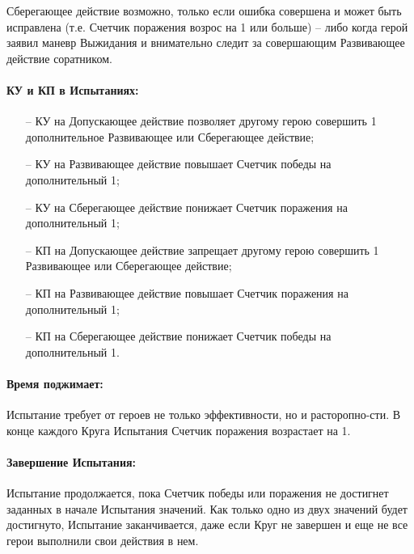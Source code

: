 \begin{itemize}
\begin{tcolorbox}
Сберегающее действие возможно, только если ошибка совершена и может быть исправлена (т.е. Счетчик поражения возрос на 1 или больше) – либо когда герой заявил маневр Выжидания и внимательно следит за совершающим Развивающее действие соратником.
\end{tcolorbox}
\end{itemize}

\paragraph{КУ и КП в Испытаниях:}
\begin{itemize}
    \item[--] КУ на Допускающее действие позволяет другому герою совершить 1 дополнительное Развивающее или Сберегающее действие;
    \item[--] КУ на Развивающее действие повышает Счетчик победы на дополнительный 1;
    \item[--] КУ на Сберегающее действие понижает Счетчик поражения на дополнительный 1;
    \item[--] \tbd КП на Допускающее действие запрещает другому герою совершить 1 Развивающее или Сберегающее действие;
    \item[--] КП на Развивающее действие повышает Счетчик поражения на дополнительный 1;
    \item[--] КП на Сберегающее действие понижает Счетчик победы на дополнительный 1.
\end{itemize}

\paragraph{Время поджимает:} Испытание требует от героев не только эффективности, но и расторопно-сти. В конце каждого Круга Испытания Счетчик поражения возрастает на 1.
\paragraph{Завершение Испытания:} Испытание продолжается, пока Счетчик победы или поражения не достигнет заданных в начале Испытания значений. Как только одно из двух значений будет достигнуто, Испытание заканчивается, даже если Круг не завершен и еще не все герои выполнили свои действия в нем.
